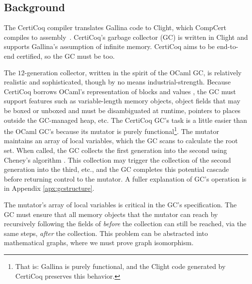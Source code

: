 

\subsection{Background}
\label{sec:gcbackground}

The CertiCoq compiler \cite{certicoqpaper} translates Gallina code to
Clight, which CompCert compiles to assembly~\cite{leroy:compcert}.
CertiCoq's garbage collector (GC) is written in Clight and 
supports Gallina's assumption of infinite memory.
CertiCoq aims to be end-to-end certified, so the GC
must be too.

The $12$-generation collector, written in the spirit of the OCaml GC,
is relatively realistic and sophisticated, though by no means
industrial-strength.
Because CertiCoq borrows OCaml's representation of blocks and
values \cite{realworldocaml}, the GC must support features such as
variable-length memory objects, object fields that may be boxed
or unboxed and must be disambiguated at runtime, pointers to places
outside the GC-managed heap, etc.
The CertiCoq GC's task is a little easier than the OCaml GC's because
its mutator is purely functional\footnote{That is: Gallina is purely functional, and
the Clight code generated by CertiCoq preserves this behavior.}. 
The mutator maintains an  array of
local variables, which the GC scans to
calculate the root set. When called, the GC collects the first generation
into the second using Cheney's algorithm \cite{cheney:gc}.
This collection may trigger the collection of the second generation
into the third, etc., and the GC completes this potential cascade
before returning control to the mutator. A
fuller explanation of GC's operation is in Appendix \ref{apx:gcstructure}.

The mutator's  array of local variables is critical in the GC's specification. 
The GC must ensure that all memory objects that the mutator can reach by recursively 
following the fields of  \emph{before} the collection can still be reached, 
via the same steps, \emph{after} the collection.  This problem can be abstracted into 
mathematical graphs, where we must prove graph isomorphism.

